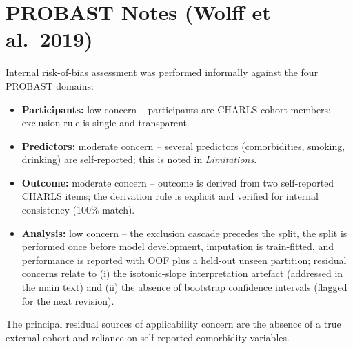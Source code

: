 \documentclass[11pt,a4paper]{article}
\begin{document}
\section*{PROBAST Notes (Wolff et al.\ 2019)}
Internal risk-of-bias assessment was performed informally against the four PROBAST domains:
\begin{itemize}
\item \textbf{Participants:} low concern -- participants are CHARLS cohort members; exclusion rule is single and transparent.
\item \textbf{Predictors:} moderate concern -- several predictors (comorbidities, smoking, drinking) are self-reported; this is noted in \emph{Limitations}.
\item \textbf{Outcome:} moderate concern -- outcome is derived from two self-reported CHARLS items; the derivation rule is explicit and verified for internal consistency (100\% match).
\item \textbf{Analysis:} low concern -- the exclusion cascade precedes the split, the split is performed once before model development, imputation is train-fitted, and performance is reported with OOF plus a held-out unseen partition; residual concerns relate to (i) the isotonic-slope interpretation artefact (addressed in the main text) and (ii) the absence of bootstrap confidence intervals (flagged for the next revision).
\end{itemize}

The principal residual sources of applicability concern are the absence of a true external cohort and reliance on self-reported comorbidity variables.
\end{document}
